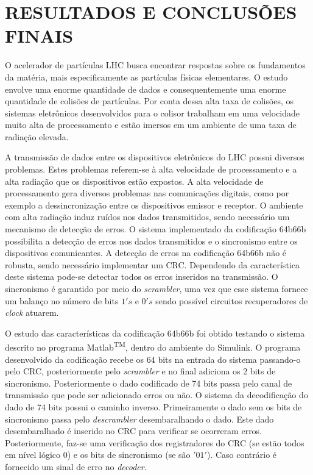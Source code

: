\chapter[RESULTADOS E CONCLUSÕES FINAIS]{RESULTADOS E CONCLUSÕES FINAIS} \label{concu:teo}

O acelerador de partículas LHC busca encontrar respostas sobre os fundamentos da matéria, mais especificamente as partículas físicas elementares. O estudo envolve uma enorme quantidade de dados e consequentemente uma enorme quantidade de colisões de partículas. Por conta dessa alta taxa de colisões, os sistemas eletrônicos desenvolvidos para o colisor trabalham em uma velocidade muito alta de processamento e estão imersos em um ambiente de uma taxa de radiação elevada. 

A transmissão de dados entre os dispositivos eletrônicos do LHC possui diversos problemas. Estes problemas referem-se à alta velocidade de processamento e a alta radiação que os dispositivos estão expostos. A alta velocidade  de processamento gera diversos problemas nas comunicações digitais, como por exemplo a dessincronização entre os dispositivos emissor e receptor. O ambiente com alta radiação induz ruídos nos dados transmitidos, sendo necessário um mecanismo de detecção de erros. O sistema implementado da codificação 64b66b possibilita a detecção de erros nos dados transmitidos e o sincronismo entre os dispositivos comunicantes. A detecção de erros na codificação 64b66b não é robusta, sendo necessário implementar um CRC. Dependendo da característica deste sistema pode-se detectar todos os erros inseridos na transmissão. O sincronismo é garantido por meio do \textit{scrambler}, uma vez que esse sistema fornece um balanço no número de bits $1's$ e $0's$ sendo possível circuitos recuperadores de \textit{clock} atuarem.

O estudo das características da codificação 64b66b foi obtido testando o sistema descrito no programa Matlab\textsuperscript{TM}, dentro do ambiente do Simulink. O programa desenvolvido da codificação recebe os 64 bits na entrada do sistema passando-o pelo CRC, posteriormente pelo \textit{scrambler} e no final adiciona os 2 bits de sincronismo. Posteriormente o dado codificado de 74 bits passa pelo canal de transmissão que pode ser adicionado erros ou não. O sistema da decodificação do dado de 74 bits possui o caminho inverso. Primeiramente o dado sem os bits de sincronismo passa pelo \textit{descrambler} desembaralhando o dado. Este dado desembaralhado é inserido no CRC para verificar se ocorreram erros. Posteriormente, faz-se uma verificação dos registradores do CRC (se estão todos em nível lógico $0$) e os bits de sincronismo (se são $'01'$). Caso contrário é fornecido um sinal de erro no \textit{decoder}. 


